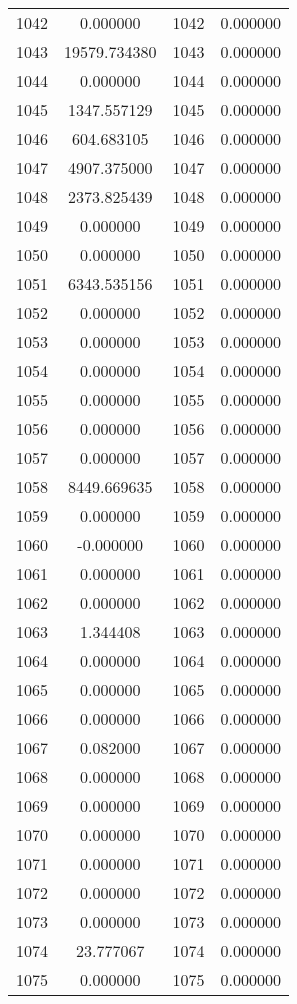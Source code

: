 \documentclass[12pt]{article}
\begin{document}
\begin{longtable}{@{}cccc@{}}
1042 & 0.000000 & 1042 & 0.000000 \\
1043 & 19579.734380 & 1043 & 0.000000 \\
1044 & 0.000000 & 1044 & 0.000000 \\
1045 & 1347.557129 & 1045 & 0.000000 \\
1046 & 604.683105 & 1046 & 0.000000 \\
1047 & 4907.375000 & 1047 & 0.000000 \\
1048 & 2373.825439 & 1048 & 0.000000 \\
1049 & 0.000000 & 1049 & 0.000000 \\
1050 & 0.000000 & 1050 & 0.000000 \\
1051 & 6343.535156 & 1051 & 0.000000 \\
1052 & 0.000000 & 1052 & 0.000000 \\
1053 & 0.000000 & 1053 & 0.000000 \\
1054 & 0.000000 & 1054 & 0.000000 \\
1055 & 0.000000 & 1055 & 0.000000 \\
1056 & 0.000000 & 1056 & 0.000000 \\
1057 & 0.000000 & 1057 & 0.000000 \\
1058 & 8449.669635 & 1058 & 0.000000 \\
1059 & 0.000000 & 1059 & 0.000000 \\
1060 & -0.000000 & 1060 & 0.000000 \\
1061 & 0.000000 & 1061 & 0.000000 \\
1062 & 0.000000 & 1062 & 0.000000 \\
1063 & 1.344408 & 1063 & 0.000000 \\
1064 & 0.000000 & 1064 & 0.000000 \\
1065 & 0.000000 & 1065 & 0.000000 \\
1066 & 0.000000 & 1066 & 0.000000 \\
1067 & 0.082000 & 1067 & 0.000000 \\
1068 & 0.000000 & 1068 & 0.000000 \\
1069 & 0.000000 & 1069 & 0.000000 \\
1070 & 0.000000 & 1070 & 0.000000 \\
1071 & 0.000000 & 1071 & 0.000000 \\
1072 & 0.000000 & 1072 & 0.000000 \\
1073 & 0.000000 & 1073 & 0.000000 \\
1074 & 23.777067 & 1074 & 0.000000 \\
1075 & 0.000000 & 1075 & 0.000000 \\

\end{longtable}
\end{document}
